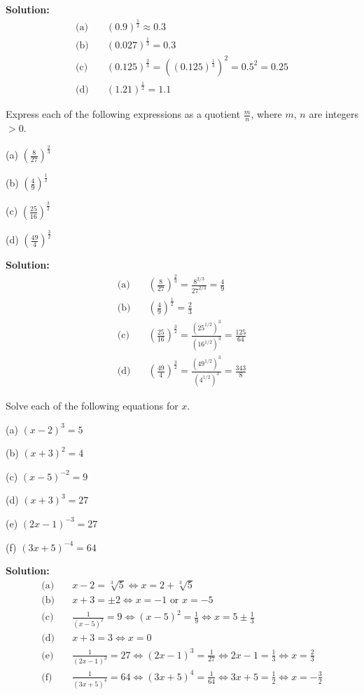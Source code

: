 \documentclass[6pt]{article}
\begin{document}
\textbf{Solution:}
\begin{align*}
\text{(a)}\quad & (0.9)^{\frac{1}{2}} \approx 0.3 \\
\text{(b)}\quad & (0.027)^{\frac{1}{3}} = 0.3 \\
\text{(c)}\quad & (0.125)^{\frac{2}{3}} = ((0.125)^{\frac{1}{3}})^2 = 0.5^2 = 0.25 \\
\text{(d)}\quad & (1.21)^{\frac{1}{2}} = 1.1
\end{align*}

\begin{tcolorbox}[title=Problem 8, breakable]
    Express each of the following expressions as a quotient $\frac{m}{n}$, where $m$,
    $n$ are integers $> 0$.

    (a) $\left(\frac{8}{27}\right)^{\frac{2}{3}}$

    (b) $\left(\frac{4}{9}\right)^{\frac{1}{2}}$

    (c) $\left(\frac{25}{16}\right)^{\frac{3}{2}}$

    (d) $\left(\frac{49}{4}\right)^{\frac{3}{2}}$
\end{tcolorbox}

\textbf{Solution:}
\begin{align*}
\text{(a)}\quad & \left(\frac{8}{27}\right)^{\frac{2}{3}} = \frac{8^{2/3}}{27^{2/3}} = \frac{4}{9} \\
\text{(b)}\quad & \left(\frac{4}{9}\right)^{\frac{1}{2}} = \frac{2}{3} \\
\text{(c)}\quad & \left(\frac{25}{16}\right)^{\frac{3}{2}} = \frac{(25^{1/2})^3}{(16^{1/2})^3} = \frac{125}{64} \\
\text{(d)}\quad & \left(\frac{49}{4}\right)^{\frac{3}{2}} = \frac{(49^{1/2})^3}{(4^{1/2})^3} = \frac{343}{8}
\end{align*}

\begin{tcolorbox}[title=Problem 9, breakable]
    Solve each of the following equations for $x$.

    (a) $(x - 2)^{3} = 5$

    (b) $(x + 3)^{2} = 4$

    (c) $(x - 5)^{-2} = 9$

    (d) $(x + 3)^{3} = 27$

    (e) $(2x - 1)^{-3} = 27$

    (f) $(3x + 5)^{-4} = 64$
\end{tcolorbox}

\textbf{Solution:}
\begin{align*}
\text{(a)}\quad & x - 2 = \sqrt[3]{5} \iff x = 2 + \sqrt[3]{5} \\
\text{(b)}\quad & x + 3 = \pm 2 \iff x = -1 \text{ or } x = -5 \\
\text{(c)}\quad & \frac{1}{(x-5)^2} = 9 \iff (x-5)^2 = \frac{1}{9} \iff x = 5 \pm \frac{1}{3} \\
\text{(d)}\quad & x + 3 = 3 \iff x = 0 \\
\text{(e)}\quad & \frac{1}{(2x-1)^3} = 27 \iff (2x-1)^3 = \frac{1}{27} \iff 2x-1 = \frac{1}{3} \iff x = \frac{2}{3} \\
\text{(f)}\quad & \frac{1}{(3x+5)^4} = 64 \iff (3x+5)^4 = \frac{1}{64} \iff 3x+5 = \frac{1}{2} \iff x = -\frac{3}{2}
\end{align*}
\end{document}
